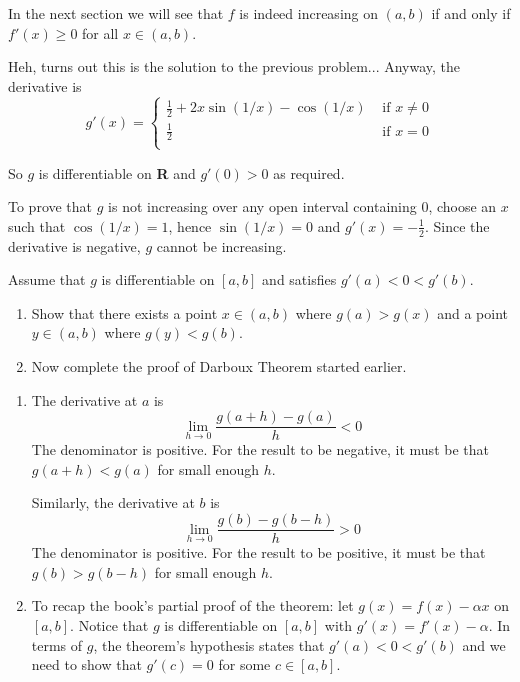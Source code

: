 \documentclass{oxmathproblems}
\begin{document}
\begin{questions}
In the next section we will see that
$f$ is indeed increasing on $(a, b)$ if and only if $f'(x) \geq 0$ for all $x \in (a, b)$.

\begin{solution}
  Heh, turns out this is the solution to the previous problem... Anyway, the derivative is
  \[
    g'(x) = 
    \begin{cases}
      \frac{1}{2} + 2x \sin(1/x) - \cos(1/x) & \text{ if } x \neq 0\\
      \frac{1}{2} & \text{ if } x=0\\
    \end{cases}
  \]

  So $g$ is differentiable on \textbf{R} and $g'(0) > 0$ as required.

  To prove that $g$ is not increasing over any open interval containing 0, choose an $x$ such that $\cos(1/x)=1$, hence $\sin(1/x)=0$ and $g'(x)=-\frac{1}{2}$.
  Since the derivative is negative, $g$ cannot be increasing.
\end{solution}

\miquestion Assume that $g$ is differentiable on $[a, b]$ and satisfies $g'(a) < 0 < g'(b)$.
\begin{enumerate}[label=(\alph*)]
  \item Show that there exists a point $x \in (a, b)$ where $g(a) > g(x)$ and a point $y \in (a, b)$ where $g(y) < g(b)$.
  \item Now complete the proof of Darboux Theorem started earlier.
\end{enumerate}

\begin{solution}
  \begin{enumerate}[label=(\alph*)]
    \item The derivative at $a$ is
    \[\lim_{h \to 0}\frac{g(a+h)-g(a)}{h} < 0\]
    The denominator is positive. For the result to be negative, it must be that  $g(a+h) < g(a)$ for small enough $h$.

    Similarly, the derivative at $b$ is
    \[\lim_{h \to 0}\frac{g(b)-g(b-h)}{h} > 0\]
    The denominator is positive. For the result to be positive, it must be that  $g(b) > g(b-h)$ for small enough $h$.

    \item To recap the book's partial proof of the theorem: let $g(x)=f(x)-\alpha x$ on $[a, b]$. Notice that $g$ is differentiable
    on $[a, b]$ with $g'(x)=f'(x)-\alpha$. In terms of $g$, the theorem's hypothesis states that $g'(a) < 0 < g'(b)$ and we need to show
    that $g'(c)=0$ for some $c \in [a, b]$.


\end{enumerate}
\end{solution}
\end{questions}
\end{document}

